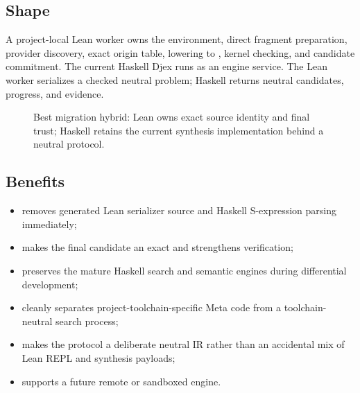 \documentclass[10pt,letterpaper,oneside]{report}
\newcommand{\code}[1]{\texttt{\detokenize{#1}}}
\begin{document}
\subsection{Shape}

A project-local Lean worker owns the environment, direct fragment preparation, provider discovery, exact origin table, lowering to \code{Expr}, kernel checking, and candidate commitment. The current Haskell Djex runs as an engine service. The Lean worker serializes a checked neutral problem; Haskell returns neutral candidates, progress, and evidence.

\begin{figure}[H]
\centering
{}
\caption{Best migration hybrid: Lean owns exact source identity and final trust; Haskell retains the current synthesis implementation behind a neutral protocol.}
\end{figure}

\subsection{Benefits}

\begin{itemize}
  \item removes generated Lean serializer source and Haskell S-expression parsing immediately;
  \item makes the final candidate an exact \code{Expr} and strengthens verification;
  \item preserves the mature Haskell search and semantic engines during differential development;
  \item cleanly separates project-toolchain-specific Meta code from a toolchain-neutral search process;
  \item makes the protocol a deliberate neutral IR rather than an accidental mix of Lean REPL and synthesis payloads;
  \item supports a future remote or sandboxed engine.
\end{itemize}
\end{document}
